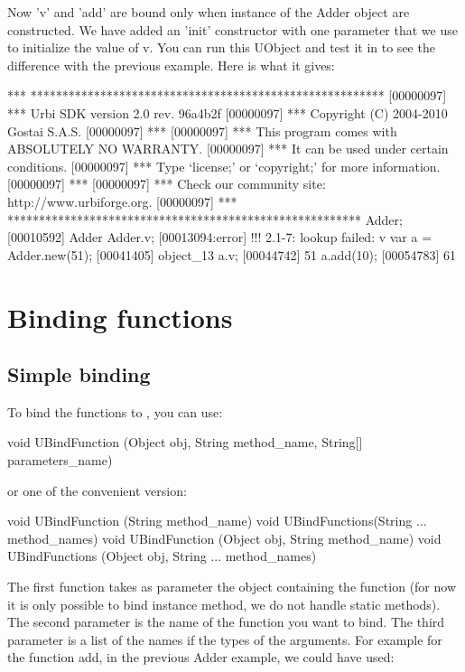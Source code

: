 Now 'v' and 'add' are bound only when instance of the Adder object are
constructed. We have added an 'init' constructor with one parameter that
we use to initialize the value of v. You can run this UObject and test
it in \urbi to see the difference with the previous example. Here is what
it gives:

\begin{urbiunchecked}
[00000097] *** ********************************************************
[00000097] *** Urbi SDK version 2.0 rev. 96a4b2f
[00000097] *** Copyright (C) 2004-2010 Gostai S.A.S.
[00000097] ***
[00000097] *** This program comes with ABSOLUTELY NO WARRANTY.
[00000097] *** It can be used under certain conditions.
[00000097] *** Type `license;' or `copyright;' for more information.
[00000097] ***
[00000097] *** Check our community site: http://www.urbiforge.org.
[00000097] *** ********************************************************
Adder;
[00010592] Adder
Adder.v;
[00013094:error] !!! 2.1-7: lookup failed: v
var a = Adder.new(51);
[00041405] object_13
a.v;
[00044742] 51
a.add(10);
[00054783] 61
\end{urbiunchecked}


\section{Binding functions}
\label{sec:uob:apijava:func}

\subsection{Simple binding}

To bind the functions to \urbi, you can use:
\begin{java}
void UBindFunction (Object obj, String method_name, String[] parameters_name)
\end{java}
or one of the convenient version:
\begin{java}
void UBindFunction (String method_name)
void UBindFunctions(String ... method_names)
void UBindFunction (Object obj, String method_name)
void UBindFunctions (Object obj, String ... method_names)
\end{java}

The first function takes as parameter the object containing the function
(for now it is only possible to bind instance method, we do not handle static
methods). The second parameter is the name of the function you want to bind.
The third parameter is a list of the names if the types of the arguments.
For example for the function add, in the previous Adder example, we could have
used:

